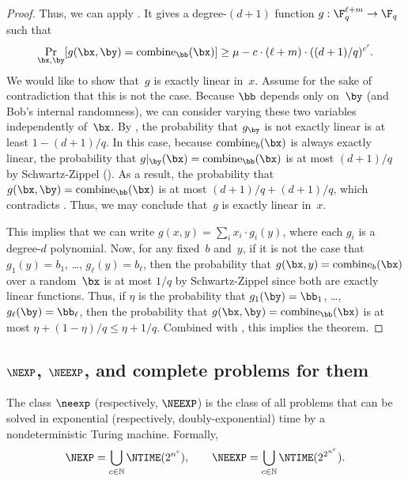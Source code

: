 \documentclass[11pt]{article}
\begin{document}
\begin{proof}
Thus, we can apply . It gives a degree-$(d+1)$ function $g: \F_q^{\ell + m} \rightarrow \F_q$ such that
\begin{equation}\label{eq:g-equals-combine}
\Pr_{\bx, \by}[g(\bx, \by) = \mathrm{combine}_{\bb}(\bx)] \geq \mu - c \cdot (\ell + m)\cdot ((d+1)/q)^{c'}.
\end{equation}
We would like to show that~$g$ is exactly linear in~$x$.
Assume for the sake of contradiction that this is not the case.
Because $\bb$ depends only on~$\by$ (and Bob's internal randomness),
we can consider varying these two variables independently of~$\bx$.
By , the probability that $g_{\by}$ is not exactly linear is at least $1-(d+1)/q$.
In this case, because $\mathrm{combine}_b(\bx)$ is always exactly linear,
the probability that $g|_{\by}(\bx) = \mathrm{combine}_{\bb}(\bx)$ is at most $(d+1)/q$ by Schwartz-Zippel ().
As a result, the probability that $g(\bx, \by) = \mathrm{combine}_{\bb}(\bx)$ is at most $(d+1)/q + (d+1)/q$, which contradicts .
Thus, we may conclude that~$g$ is exactly linear in~$x$.

This implies that we can write $g(x, y) = \sum_i x_i \cdot g_i(y)$, where each $g_i$ is a degree-$d$ polynomial.
Now, for any fixed~$b$ and~$y$, if it is not the case that $g_1(y) = b_1$, \ldots, $g_\ell(y) = b_\ell$,
then the probability that $g(\bx, y) = \mathrm{combine}_{b}(\bx)$ over a random~$\bx$ is at most $1/q$ by Schwartz-Zippel since both are exactly linear functions.
Thus, if $\eta$ is the probability that $g_1(\by) = \bb_1$, \ldots, $g_\ell(\by) = \bb_\ell$,
then the probability that $g(\bx, \by) = \mathrm{combine}_{\bb}(\bx)$ is at most $\eta + (1-\eta)/q \leq \eta + 1/q$.
Combined with , this implies the theorem.
\end{proof}

\subsection{$\NEXP$, $\NEEXP$, and complete problems for them}

\begin{definition}
  \label{def:neexp}
  The class $\neexp$ (respectively, $\NEEXP$) is the class of all problems that can be solved
  in exponential (respectively, doubly-exponential) time by a nondeterministic Turing
  machine. Formally,
\begin{equation*}
\NEXP = \bigcup_{c \in \mathbb{N}}  \NTIME(2^{n^c}),\qquad
\NEEXP = \bigcup_{c \in \mathbb{N}}  \NTIME(2^{2^{n^c}}).
\end{equation*}
\end{definition}
\end{document}
